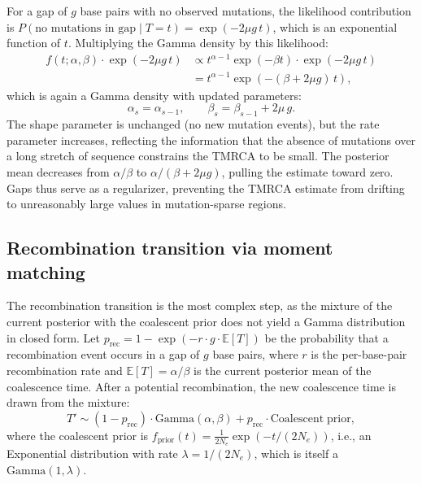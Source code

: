 \documentclass[10pt,letterpaper]{article}
\begin{document}
For a gap of $g$ base pairs with no observed mutations, the likelihood contribution is $P(\text{no mutations in gap} \mid T = t) = \exp(-2\mu g\, t)$, which is an exponential function of $t$. Multiplying the Gamma density by this likelihood:
\begin{align}
f(t; \alpha, \beta) \cdot \exp(-2\mu g\, t) &\propto t^{\alpha-1} \exp(-\beta t) \cdot \exp(-2\mu g\, t) \nonumber \\
&= t^{\alpha-1} \exp(-(\beta + 2\mu g)\, t),
\end{align}
which is again a Gamma density with updated parameters:
\begin{equation}
\alpha_s = \alpha_{s-1}, \qquad \beta_s = \beta_{s-1} + 2\mu\, g.
\label{eq:gap_update}
\end{equation}
The shape parameter is unchanged (no new mutation events), but the rate parameter increases, reflecting the information that the absence of mutations over a long stretch of sequence constrains the TMRCA to be small. The posterior mean decreases from $\alpha/\beta$ to $\alpha/(\beta + 2\mu g)$, pulling the estimate toward zero. Gaps thus serve as a regularizer, preventing the TMRCA estimate from drifting to unreasonably large values in mutation-sparse regions.

\subsection{Recombination transition via moment matching}

The recombination transition is the most complex step, as the mixture of the current posterior with the coalescent prior does not yield a Gamma distribution in closed form. Let $p_{\mathrm{rec}} = 1 - \exp(-r \cdot g \cdot \mathbb{E}[T])$ be the probability that a recombination event occurs in a gap of $g$ base pairs, where $r$ is the per-base-pair recombination rate and $\mathbb{E}[T] = \alpha/\beta$ is the current posterior mean of the coalescence time. After a potential recombination, the new coalescence time is drawn from the mixture:
\begin{equation}
T' \sim (1 - p_{\mathrm{rec}}) \cdot \mathrm{Gamma}(\alpha, \beta) + p_{\mathrm{rec}} \cdot \mathrm{Coalescent\;prior},
\label{eq:recomb_mixture}
\end{equation}
where the coalescent prior is $f_{\mathrm{prior}}(t) = \frac{1}{2N_e}\exp(-t/(2N_e))$, i.e., an Exponential distribution with rate $\lambda = 1/(2N_e)$, which is itself a $\mathrm{Gamma}(1, \lambda)$.
\end{document}
